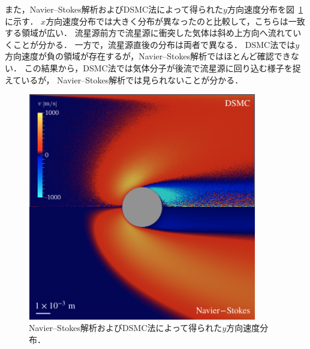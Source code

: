 また，Navier–Stokes解析およびDSMC法によって得られた$y$方向速度分布を図~\ref{fig:comparison-v}に示す．
$x$方向速度分布では大きく分布が異なったのと比較して，こちらは一致する領域が広い．
流星源前方で流星源に衝突した気体は斜め上方向へ流れていくことが分かる．
一方で，流星源直後の分布は両者で異なる．
DSMC法では$y$方向速度が負の領域が存在するが，Navier–Stokes解析ではほとんど確認できない．
この結果から，DSMC法では気体分子が後流で流星源に回り込む様子を捉えているが，
Navier–Stokes解析では見られないことが分かる．
\begin{figure}[H]
    \centering
    \includegraphics[width=10cm,clip]{fig/min_knud/comparison/v-crop.png}
    \caption{Navier–Stokes解析およびDSMC法によって得られた$y$方向速度分布．}
    \label{fig:comparison-v}
\end{figure}

